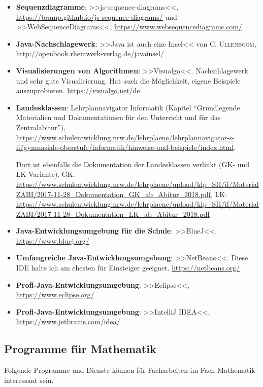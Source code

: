 \documentclass[11pt, a4paper, oneside, openright]{article}
\begin{document}
\begin{itemize}
    \item \textbf{Sequenzdiagramme}: >>js-sequence-diagrams<<, \url{https://bramp.github.io/js-sequence-diagrams/} und >>WebSequenceDiagrams<<, \url{https://www.websequencediagrams.com/}
    
    \item \textbf{Java-Nachschlagewerk}: >>Java ist auch eine Insel<< von C. \textsc{Ullenboom}, \url{http://openbook.rheinwerk-verlag.de/javainsel/}
    
    \item \textbf{Visualisierungen von Algorithmen}: >>Visualgo<<. Nachschlagewerk und sehr gute Visualisierung. Hat auch die Möglichkeit, eigene Beispiele auszuprobieren. \url{https://visualgo.net/de}
    
    \item \textbf{Landesklassen}: Lehrplannavigator Informatik (Kapitel \enquote{Grundlegende Materialien und Dokumentationen für den Unterricht und für das Zentralabitur}), \url{https://www.schulentwicklung.nrw.de/lehrplaene/lehrplannavigator-s-ii/gymnasiale-oberstufe/informatik/hinweise-und-beispiele/index.html}. 
    
    Dort ist ebenfalls die Dokumentation der Landesklassen verlinkt (GK- und LK-Variante). GK:  \url{https://www.schulentwicklung.nrw.de/lehrplaene/upload/klp_SII/if/MaterialZABI/2017-11-28_Dokumentation_GK_ab_Abitur_2018.pdf}, LK: \url{https://www.schulentwicklung.nrw.de/lehrplaene/upload/klp_SII/if/MaterialZABI/2017-11-28_Dokumentation_LK_ab_Abitur_2018.pdf}
    
    \item \textbf{Java-Entwicklungsumgebung für die Schule}: >>BlueJ<<, \url{https://www.bluej.org/}
    
    \item \textbf{Umfangreiche Java-Entwicklungsumgebung}: >>NetBeans<<. Diese IDE halte ich am ehesten für Einsteiger geeignet. \url{https://netbeans.org/}
    
    \item \textbf{Profi-Java-Entwicklungsumgebung}: >>Eclipse<<, \url{https://www.eclipse.org/}
    
    \item \textbf{Profi-Java-Entwicklungsumgebung}: >>IntelliJ IDEA<<, \url{https://www.jetbrains.com/idea/}
\end{itemize}





\subsection{Programme für Mathematik}
\label{sec:programmeMathematik}
Folgende Programme und Dienste können für Facharbeiten im Fach Mathematik interessant sein.
\end{document}

